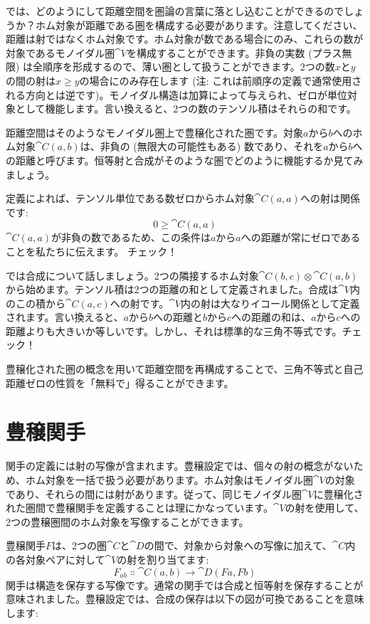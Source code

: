 では、どのようにして距離空間を圏論の言葉に落とし込むことができるのでしょうか？ホム対象が距離である圏を構成する必要があります。注意してください、距離は射ではなくホム対象です。ホム対象が数である場合にのみ、これらの数が対象であるモノイダル圏$\cat{V}$を構成することができます。非負の実数 (プラス無限) は全順序を形成するので、薄い圏として扱うことができます。2つの数$x$と$y$の間の射は$x \geqslant y$の場合にのみ存在します (注: これは前順序の定義で通常使用される方向とは逆です)。モノイダル構造は加算によって与えられ、ゼロが単位対象として機能します。言い換えると、2つの数のテンソル積はそれらの和です。

距離空間はそのようなモノイダル圏上で豊穣化された圏です。対象$a$から$b$へのホム対象$\cat{C}(a, b)$は、非負の (無限大の可能性もある) 数であり、それを$a$から$b$への距離と呼びます。恒等射と合成がそのような圏でどのように機能するか見てみましょう。

定義によれば、テンソル単位である数ゼロからホム対象$\cat{C}(a, a)$への射は関係です: 
\[0 \geqslant \cat{C}(a, a)\]
$\cat{C}(a, a)$が非負の数であるため、この条件は$a$から$a$への距離が常にゼロであることを私たちに伝えます。
チェック！

では合成について話しましょう。2つの隣接するホム対象$\cat{C}(b, c) \otimes \cat{C}(a, b)$から始めます。テンソル積は2つの距離の和として定義されました。合成は$\cat{V}$内のこの積から$\cat{C}(a, c)$への射です。$\cat{V}$内の射は大なりイコール関係として定義されます。言い換えると、$a$から$b$への距離と$b$から$c$への距離の和は、$a$から$c$への距離よりも大きいか等しいです。しかし、それは標準的な三角不等式です。チェック！

豊穣化された圏の概念を用いて距離空間を再構成することで、三角不等式と自己距離ゼロの性質を「無料で」得ることができます。

\section{豊穣関手}

関手の定義には射の写像が含まれます。豊穣設定では、個々の射の概念がないため、ホム対象を一括で扱う必要があります。ホム対象はモノイダル圏$\cat{V}$の対象であり、それらの間には射があります。従って、同じモノイダル圏$\cat{V}$に豊穣化された圏間で豊穣関手を定義することは理にかなっています。$\cat{V}$の射を使用して、2つの豊穣圏間のホム対象を写像することができます。

豊穣関手$F$は、2つの圏$\cat{C}$と$\cat{D}$の間で、対象から対象への写像に加えて、$\cat{C}$内の各対象ペアに対して$\cat{V}$の射を割り当てます: 
\[F_{a b} \Colon \cat{C}(a, b) \to \cat{D}(F a, F b)\]
関手は構造を保存する写像です。通常の関手では合成と恒等射を保存することが意味されました。豊穣設定では、合成の保存は以下の図が可換であることを意味します: 

